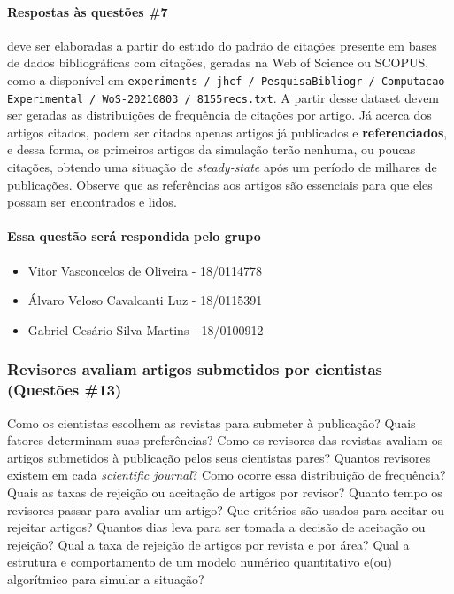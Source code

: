 \paragraph{Respostas às questões \#7} deve ser elaboradas a partir do estudo do padrão de citações presente em bases de dados bibliográficas com citações, geradas na Web of Science ou SCOPUS, como a disponível em  \texttt{experiments / jhcf / PesquisaBibliogr / Computacao Experimental / WoS-20210803 / 8155recs.txt}. A partir desse dataset devem ser geradas as distribuições de frequência de citações por artigo. Já acerca dos artigos citados, podem ser citados apenas artigos já publicados e \textbf{referenciados}, e dessa forma, os primeiros artigos da simulação terão nenhuma, ou poucas citações, obtendo uma situação de \textit{steady-state} após um período de milhares de publicações. Observe que as referências aos artigos são essenciais para que eles possam ser encontrados e lidos.

\paragraph{Essa questão será respondida pelo grupo}

\begin{itemize}
 \item Vitor Vasconcelos de Oliveira - 18/0114778
 \item Álvaro Veloso Cavalcanti Luz - 18/0115391 
 \item Gabriel Cesário Silva Martins - 18/0100912 
\end{itemize}


\subsubsection{Revisores avaliam artigos submetidos por cientistas (Questões \#13)}  Como os cientistas escolhem as revistas para submeter à publicação? Quais fatores determinam suas preferências? Como os revisores das revistas avaliam os artigos submetidos à publicação pelos seus cientistas pares? Quantos revisores existem em cada \textit{scientific journal}? Como ocorre essa distribuição de frequência? Quais as taxas de rejeição ou aceitação de artigos por revisor? Quanto tempo os revisores passar para avaliar um artigo? Que critérios são usados para aceitar ou rejeitar artigos? Quantos dias leva para ser tomada a decisão de aceitação ou rejeição? Qual a taxa de rejeição de artigos por revista e por área? Qual a estrutura e comportamento de um modelo numérico quantitativo e(ou) algorítmico para simular a situação? 

